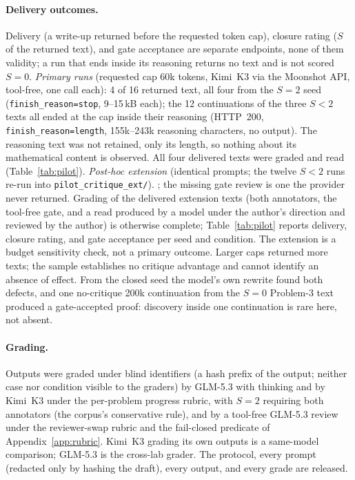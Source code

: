 \paragraph{Delivery outcomes.} Delivery (a write-up returned before the requested token cap), closure rating ($S$ of the returned text), and gate acceptance are separate endpoints, none of them validity; a run that ends inside its reasoning returns no text and is not scored $S{=}0$. \emph{Primary runs} (requested cap 60k tokens, Kimi~K3 via the Moonshot API, tool-free, one call each): 4 of 16 returned text, all four from the $S{=}2$ seed (\texttt{finish\_reason=stop}, 9--15\,kB each); the 12 continuations of the three $S{<}2$ texts all ended at the cap inside their reasoning (HTTP~200, \texttt{finish\_reason=length}, 155k--243k reasoning characters, no output). The reasoning text was not retained, only its length, so nothing about its mathematical content is observed. All four delivered texts were graded and read (Table~\ref{tab:pilot}). \emph{Post-hoc extension} (identical prompts; the twelve $S{<}2$ runs re-run into \texttt{pilot\_critique\_ext/\allowbreak }). \PILOTEXT; the missing gate review is one the provider never returned. Grading of the delivered extension texts (both annotators, the tool-free gate, and a read produced by a model under the author's direction and reviewed by the author) is otherwise complete; Table~\ref{tab:pilot} reports delivery, closure rating, and gate acceptance per seed and condition. The extension is a budget sensitivity check, not a primary outcome. Larger caps returned more texts; the sample establishes no critique advantage and cannot identify an absence of effect. From the closed seed the model's own rewrite found both defects, and one no-critique 200k continuation from the $S{=}0$ Problem-3 text produced a gate-accepted proof: discovery inside one continuation is rare here, not absent.

\begin{table}[htbp]
  \caption{Paired pilot: delivery, closure rating, and gate acceptance per start text and condition (60k runs; post-hoc 200k extension).}
  \label{tab:pilot}
  \centering\scriptsize\renewcommand{\arraystretch}{0.92}
\PILOTBODY
\end{table}

\paragraph{Grading.} Outputs were graded under blind identifiers (a hash prefix of the output; neither case nor condition visible to the graders) by GLM-5.3 with thinking and by Kimi~K3 under the per-problem progress rubric, with $S{=}2$ requiring both annotators (the corpus's conservative rule), and by a tool-free GLM-5.3 review under the reviewer-swap rubric and the fail-closed predicate of Appendix~\ref{app:rubric}. Kimi~K3 grading its own outputs is a same-model comparison; GLM-5.3 is the cross-lab grader. The protocol, every prompt (redacted only by hashing the draft), every output, and every grade are released.

